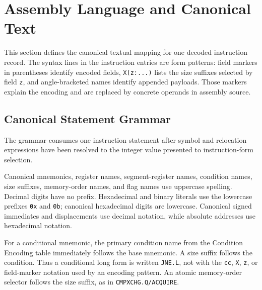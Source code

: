 \clearpage
\section{Assembly Language and Canonical Text}

This section defines the canonical textual mapping for one decoded instruction record. The syntax lines in the
instruction entries are form patterns: field markers in parentheses identify encoded fields, \texttt{X(z:...)}
lists the size suffixes selected by field \texttt{z}, and angle-bracketed names identify appended payloads. Those
markers explain the encoding and are replaced by concrete operands in assembly source.

\subsection{Canonical Statement Grammar}

The grammar consumes one instruction statement after symbol and relocation expressions have been resolved to the
integer value presented to instruction-form selection.

\begin{manualcode}
\end{manualcode}

Canonical mnemonics, register names, segment-register names, condition names, size suffixes, memory-order names,
and flag names use uppercase spelling. Decimal digits have no prefix. Hexadecimal and binary literals use the
lowercase prefixes \texttt{0x} and \texttt{0b}; canonical hexadecimal digits are lowercase. Canonical signed
immediates and displacements use decimal notation, while absolute addresses use hexadecimal notation.

For a conditional mnemonic, the primary condition name from the Condition Encoding table immediately follows the
base mnemonic. A size suffix follows the condition. Thus a conditional long form is written
\texttt{JNE.L}, not with the \texttt{cc}, \texttt{X}, \texttt{z}, or field-marker notation used by an encoding
pattern. An atomic memory-order selector follows the size suffix, as in
\texttt{CMPXCHG.Q/ACQUIRE}.

